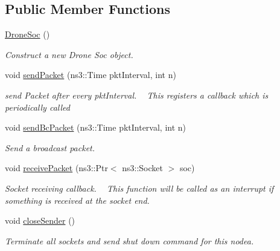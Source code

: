 \subsection*{Public Member Functions}
\begin{DoxyCompactItemize}
\item 
\mbox{\label{structrnl_1_1DroneSoc_a064d6dcee6a438e84bc75a211757518a}} 
\hyperlink{structrnl_1_1DroneSoc_a064d6dcee6a438e84bc75a211757518a}{Drone\+Soc} ()
\begin{DoxyCompactList}\small\item\em Construct a new Drone Soc object. \end{DoxyCompactList}\item 
void \hyperlink{structrnl_1_1DroneSoc_a21ec1cbe2adaefffc5f4472a59b07d6f}{send\+Packet} (ns3\+::\+Time pkt\+Interval, int n)
\begin{DoxyCompactList}\small\item\em send Packet after every pkt\+Interval. ~\newline
 This registers a callback which is periodically called \end{DoxyCompactList}\item 
void \hyperlink{structrnl_1_1DroneSoc_ab6c91121d046bf9632c1353c30ffde73}{send\+Bc\+Packet} (ns3\+::\+Time pkt\+Interval, int n)
\begin{DoxyCompactList}\small\item\em Send a broadcast packet. \end{DoxyCompactList}\item 
void \hyperlink{structrnl_1_1DroneSoc_a4945013e829ed896e2ca82699e62e711}{receive\+Packet} (ns3\+::\+Ptr$<$ ns3\+::\+Socket $>$ soc)
\begin{DoxyCompactList}\small\item\em Socket receiving callback. ~\newline
This function will be called as an interrupt if something is received at the socket end. \end{DoxyCompactList}\item 
\mbox{\label{structrnl_1_1DroneSoc_a89739bd5df166ca8b53e56eb3b10ec77}} 
void \hyperlink{structrnl_1_1DroneSoc_a89739bd5df166ca8b53e56eb3b10ec77}{close\+Sender} ()
\begin{DoxyCompactList}\small\item\em Terminate all sockets and send shut down command for this nodea. \end{DoxyCompactList}\item 

\end{DoxyCompactItemize}
